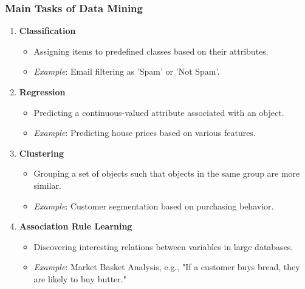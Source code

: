 \documentclass{beamer}
\begin{document}
\begin{frame}[fragile]
    \frametitle{Main Tasks of Data Mining}
    \begin{enumerate}
        \item \textbf{Classification}
            \begin{itemize}
                \item Assigning items to predefined classes based on their attributes.
                \item \textit{Example}: Email filtering as 'Spam' or 'Not Spam'.
            \end{itemize}
        \item \textbf{Regression}
            \begin{itemize}
                \item Predicting a continuous-valued attribute associated with an object.
                \item \textit{Example}: Predicting house prices based on various features.
            \end{itemize}
        \item \textbf{Clustering}
            \begin{itemize}
                \item Grouping a set of objects such that objects in the same group are more similar.
                \item \textit{Example}: Customer segmentation based on purchasing behavior.
            \end{itemize}
        \item \textbf{Association Rule Learning}
            \begin{itemize}
                \item Discovering interesting relations between variables in large databases.
                \item \textit{Example}: Market Basket Analysis, e.g., "If a customer buys bread, they are likely to buy butter."
            \end{itemize}
    \end{enumerate}
\end{frame}
\end{document}
